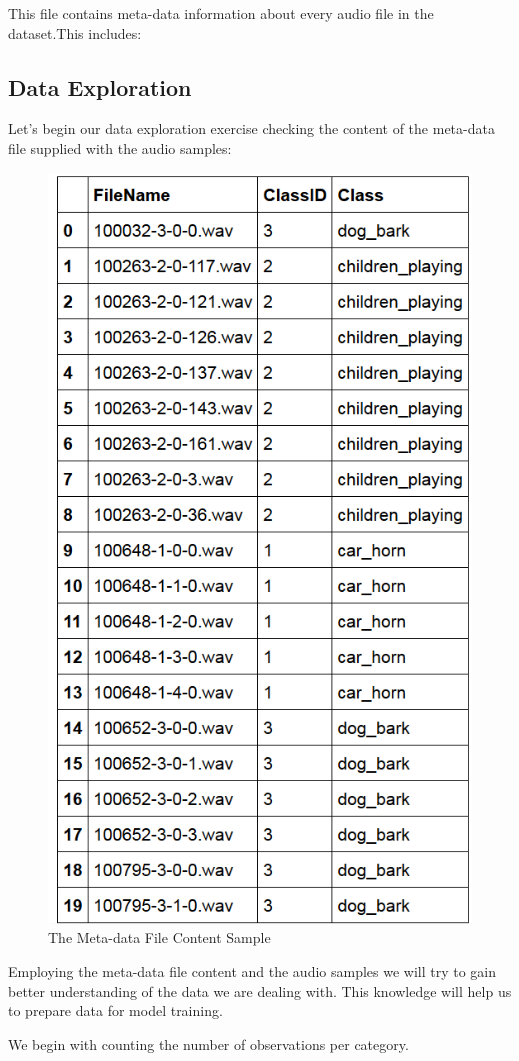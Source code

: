 This file contains meta-data information about every audio file in the
dataset.This includes:

\hypertarget{data-exploration}{%
\subsection{Data Exploration}\label{data-exploration}}

Let's begin our data exploration exercise checking the content of the
meta-data file supplied with the audio samples:

\begin{Schunk}
\begin{figure}[H]

{\centering \includegraphics[width=0.5\linewidth]{../images/metadata20} 

}

\caption[The Meta-data File Content Sample]{The Meta-data File Content Sample}\label{fig:unnamed-chunk-2}
\end{figure}
\end{Schunk}

Employing the meta-data file content and the audio samples we will try
to gain better understanding of the data we are dealing with. This
knowledge will help us to prepare data for model training.

We begin with counting the number of observations per category.

